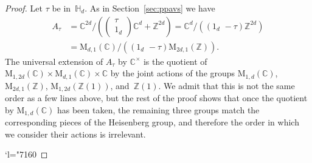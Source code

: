 \documentclass[JEP,XML,SOM,Unicode,NoFloatCountersInSection]{cedram}
\newcommand{\Changel}{\mathcode`l="7160}
\theoremstyle{plain}
\theoremstyle{definition}
\numberwithin{equation}{subsection}
\renewcommand{\C}{\mathbb C}
\newcommand{\Z}{\mathbb Z}
\renewcommand{\H}{\mathbb H}
\newcommand{\rmM}{\mathrm{M}}
\begin{document}
\begin{proof}
Let $\tau$ be in~$\H_d$. As in Section~\ref{sec:ppavs} we have
\[
\begin{aligned}
A_\tau& =\C^{2d}/((\substack{\tau\\ 1_d})\C^d+\Z^{2d}) =
\C^d/((1_d\,\,-\tau)\Z^{2d}) \\
& = \rmM_{d,1}(\C)/((1_d\,\,-\tau)\rmM_{2d,1}(\Z)).
\end{aligned}
\]
The universal extension of $A_\tau$ by $\C^\times$ is the quotient of
$\rmM_{1,2d}(\C)\times \rmM_{d,1}(\C)\times\C$ by the
joint actions of the groups
$\rmM_{1,d}(\C)$, $\rmM_{2d,1}(\Z)$, $\rmM_{1,2d}(\Z(1))$,
and~$\Z(1)$.
We admit that this is not the same order as a few lines above, but the
rest of the proof shows that once the quotient by $\rmM_{1,d}(\C)$ has
been taken, the remaining three groups match the corresponding pieces of
the Heisenberg group, and therefore the order in which we consider their
actions is irrelevant.

\Changel


\end{proof}
\end{document}
